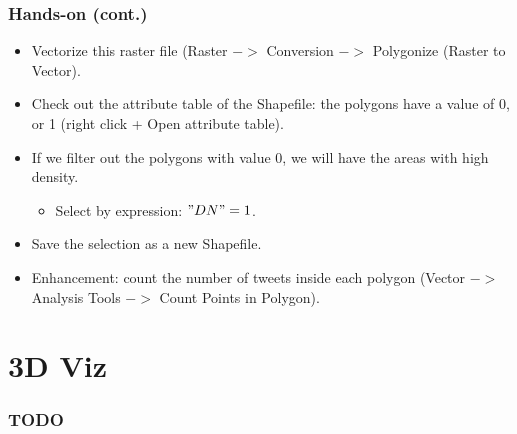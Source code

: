 \documentclass[hyperref={pdfpagelabels=true}]{beamer}
\begin{document}
\begin{frame}
\frametitle{Hands-on (cont.)}
  \begin{itemize}
    \item<1->Vectorize this raster file (Raster $->$ Conversion $->$ Polygonize (Raster to Vector).  
    \item<2->Check out the attribute table of the Shapefile: the polygons have a value of 0, or 1 (right click + Open attribute table).
    \item<3->If we filter out the polygons with value 0, we will have the areas with high density. 
      \begin{itemize}
	\item<4->Select by expression: $"DN" = 1$. 
      \end{itemize}    
    \item<5->Save the selection as a new Shapefile.
    \item<6->Enhancement: count the number of tweets inside each polygon (Vector $->$  Analysis Tools $->$ Count Points in Polygon).    
  \end{itemize}    
\end{frame}

\section{3D Viz} 
\begin{frame}
\frametitle{TODO}

\end{frame}
\end{document}
